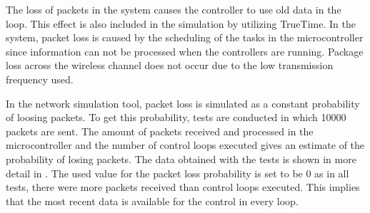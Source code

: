 
The loss of packets in the system causes the controller to use old data in the loop. This effect is also included in the simulation by utilizing TrueTime. In the system, packet loss is caused by the scheduling of the tasks in the microcontroller since information can not be processed when the controllers are running. Package loss across the wireless channel does not occur due to the low transmission frequency used. 

In the network simulation tool, packet loss is simulated as a constant probability of loosing packets. To get this probability, tests are conducted in which 10000 packets are sent. The amount of packets received and processed in the microcontroller and the number of control loops executed gives an estimate of the probability of losing packets. The data obtained with the tests is shown in more detail in . The used value for the packet loss probability is set to be 0 as in all tests, there were more packets received than control loops executed. This implies that the most recent data is available for the control in every loop. 